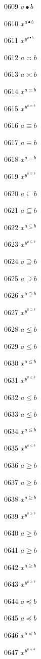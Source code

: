 \documentclass{article}
\begin{document}
0609 $\displaystyle a\bullet b$\par
0610 $x^{a\bullet b}$\par
0611 $x^{y^{a\bullet b}}$\par
0612 $a\asymp b$\par
0613 $\displaystyle a\asymp b$\par
0614 $x^{a\asymp b}$\par
0615 $x^{y^{a\asymp b}}$\par
0616 $a\equiv b$\par
0617 $\displaystyle a\equiv b$\par
0618 $x^{a\equiv b}$\par
0619 $x^{y^{a\equiv b}}$\par
0620 $a\subseteq b$\par
0621 $\displaystyle a\subseteq b$\par
0622 $x^{a\subseteq b}$\par
0623 $x^{y^{a\subseteq b}}$\par
0624 $a\supseteq b$\par
0625 $\displaystyle a\supseteq b$\par
0626 $x^{a\supseteq b}$\par
0627 $x^{y^{a\supseteq b}}$\par
0628 $a\le b$\par
0629 $\displaystyle a\le b$\par
0630 $x^{a\le b}$\par
0631 $x^{y^{a\le b}}$\par
0632 $a\leq b$\par
0633 $\displaystyle a\leq b$\par
0634 $x^{a\leq b}$\par
0635 $x^{y^{a\leq b}}$\par
0636 $a\ge b$\par
0637 $\displaystyle a\ge b$\par
0638 $x^{a\ge b}$\par
0639 $x^{y^{a\ge b}}$\par
0640 $a\geq b$\par
0641 $\displaystyle a\geq b$\par
0642 $x^{a\geq b}$\par
0643 $x^{y^{a\geq b}}$\par
0644 $a\preceq b$\par
0645 $\displaystyle a\preceq b$\par
0646 $x^{a\preceq b}$\par
0647 $x^{y^{a\preceq b}}$\par
\end{document}
